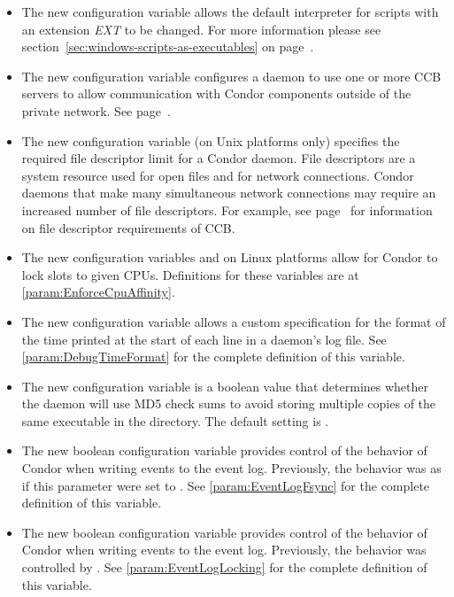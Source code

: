 \begin{itemize}

\item The new configuration variable 
allows the default interpreter for scripts with an extension \textit{EXT} to
be changed.  For more information please see
section~\ref{sec:windows-scripts-as-executables} on
page~\pageref{sec:windows-scripts-as-executables}.

\item The new configuration variable 
configures a daemon to use one or more
CCB servers to allow communication with Condor components outside of
the private network.  See page~\pageref{sec:CCB}.

\item The new configuration variable 
(on Unix platforms only) specifies the
required file descriptor limit for a Condor daemon.  File descriptors
are a system resource used for open files and for network connections.
Condor daemons that make many simultaneous network connections may
require an increased number of file descriptors.  For example, see
page~\pageref{sec:CCB} for information on file descriptor requirements
of CCB.

\item The new configuration variables  and 
 on Linux platforms allow for
Condor to lock slots to given CPUs.
Definitions for these variables are at \ref{param:EnforceCpuAffinity}.

\item The new configuration variable 
  allows a custom specification for the format of the time
  printed at the start of each line in a daemon's log file.
  See \ref{param:DebugTimeFormat} for the complete definition of
  this variable.

\item The new configuration variable 
  is a boolean value that determines whether the  daemon will
  use MD5 check sums to avoid storing multiple copies of the same
  executable in the  directory. The default setting is
  .

\item The new boolean configuration variable
   provides control of the behavior of
  Condor when writing events to the event log.  Previously,
  the behavior was as if this parameter were set to .
  See \ref{param:EventLogFsync} for the complete definition of
  this variable.

\item The new boolean configuration variable
   provides control of the behavior of
  Condor when writing events to the event log.  Previously,
  the behavior was controlled by .
  See \ref{param:EventLogLocking} for the complete definition of
  this variable.

\end{itemize}

